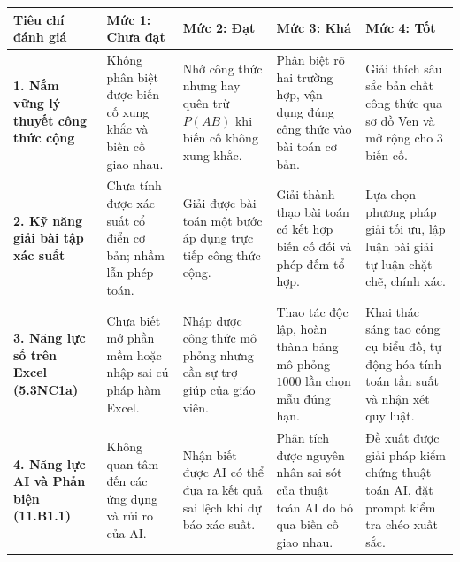 \documentclass[12pt, a4paper]{article}
\begin{document}
\begin{center}
\small
\begin{tabularx}{\linewidth}{|p{3cm}|X|X|X|X|}
\hline
\textbf{Tiêu chí đánh giá} & \textbf{Mức 1: Chưa đạt} & \textbf{Mức 2: Đạt} & \textbf{Mức 3: Khá} & \textbf{Mức 4: Tốt} \\ \hline
\textbf{1. Nắm vững lý thuyết công thức cộng} & Không phân biệt được biến cố xung khắc và biến cố giao nhau. & Nhớ công thức nhưng hay quên trừ $P(AB)$ khi biến cố không xung khắc. & Phân biệt rõ hai trường hợp, vận dụng đúng công thức vào bài toán cơ bản. & Giải thích sâu sắc bản chất công thức qua sơ đồ Ven và mở rộng cho 3 biến cố. \\ \hline
\textbf{2. Kỹ năng giải bài tập xác suất} & Chưa tính được xác suất cổ điển cơ bản; nhầm lẫn phép toán. & Giải được bài toán một bước áp dụng trực tiếp công thức cộng. & Giải thành thạo bài toán có kết hợp biến cố đối và phép đếm tổ hợp. & Lựa chọn phương pháp giải tối ưu, lập luận bài giải tự luận chặt chẽ, chính xác. \\ \hline
\textbf{3. Năng lực số trên Excel (5.3NC1a)} & Chưa biết mở phần mềm hoặc nhập sai cú pháp hàm Excel. & Nhập được công thức mô phỏng nhưng cần sự trợ giúp của giáo viên. & Thao tác độc lập, hoàn thành bảng mô phỏng $1000$ lần chọn mẫu đúng hạn. & Khai thác sáng tạo công cụ biểu đồ, tự động hóa tính toán tần suất và nhận xét quy luật. \\ \hline
\textbf{4. Năng lực AI và Phản biện (11.B1.1)} & Không quan tâm đến các ứng dụng và rủi ro của AI. & Nhận biết được AI có thể đưa ra kết quả sai lệch khi dự báo xác suất. & Phân tích được nguyên nhân sai sót của thuật toán AI do bỏ qua biến cố giao nhau. & Đề xuất được giải pháp kiểm chứng thuật toán AI, đặt prompt kiểm tra chéo xuất sắc. \\ \hline
\end{tabularx}
\end{center}
\end{document}
